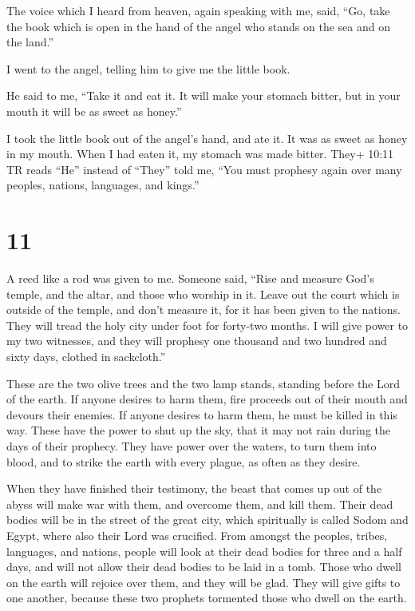  The voice which I heard from heaven, again speaking with
me, said, ``Go, take the book which is open in the hand of the angel who
stands on the sea and on the land.''

 I went to the angel, telling him to give me the little
book.

He said to me, ``Take it and eat it. It will make your stomach bitter,
but in your mouth it will be as sweet as honey.''

 I took the little book out of the angel's hand, and ate
it. It was as sweet as honey in my mouth. When I had eaten it, my
stomach was made bitter.  They+ 10:11 TR reads ``He''
instead of ``They'' told me, ``You must prophesy again over many
peoples, nations, languages, and kings.''

\hypertarget{section-10}{%
\section{11}\label{section-10}}

 A reed like a rod was given to me. Someone said, ``Rise and
measure God's temple, and the altar, and those who worship in it.
 Leave out the court which is outside of the temple, and
don't measure it, for it has been given to the nations. They will tread
the holy city under foot for forty-two months.  I will give
power to my two witnesses, and they will prophesy one thousand and two
hundred and sixty days, clothed in sackcloth.''

 These are the two olive trees and the two lamp stands,
standing before the Lord of the earth.  If anyone desires to
harm them, fire proceeds out of their mouth and devours their enemies.
If anyone desires to harm them, he must be killed in this way.
 These have the power to shut up the sky, that it may not
rain during the days of their prophecy. They have power over the waters,
to turn them into blood, and to strike the earth with every plague, as
often as they desire.

 When they have finished their testimony, the beast that
comes up out of the abyss will make war with them, and overcome them,
and kill them.  Their dead bodies will be in the street of
the great city, which spiritually is called Sodom and Egypt, where also
their Lord was crucified.  From amongst the peoples, tribes,
languages, and nations, people will look at their dead bodies for three
and a half days, and will not allow their dead bodies to be laid in a
tomb.  Those who dwell on the earth will rejoice over them,
and they will be glad. They will give gifts to one another, because
these two prophets tormented those who dwell on the earth.

